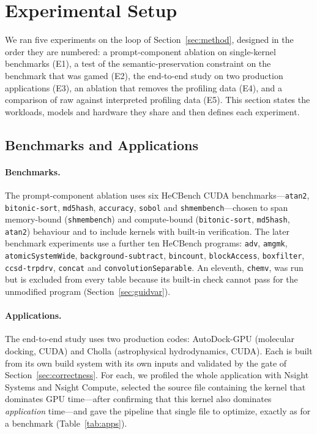 \section{Experimental Setup}
\label{sec:setup}
We ran five experiments on the loop of Section~\ref{sec:method}, designed in the order they are
numbered: a prompt-component ablation on single-kernel benchmarks (E1), a test of the
semantic-preservation constraint on the benchmark that was gamed (E2), the end-to-end study on two
production applications (E3), an ablation that removes the profiling data (E4), and a comparison of
raw against interpreted profiling data (E5). This section states the workloads, models and hardware
they share and then defines each experiment.

\subsection{Benchmarks and Applications}
\label{sec:explanation}
\paragraph{Benchmarks.}
The prompt-component ablation uses six HeCBench \cite{jin2023hecbench} CUDA benchmarks---\texttt{atan2},
\texttt{bitonic-sort}, \texttt{md5hash}, \texttt{accuracy}, \texttt{sobol} and
\texttt{shmembench}---chosen to span memory-bound (\texttt{shmembench}) and compute-bound
(\texttt{bitonic-sort}, \texttt{md5hash}, \texttt{atan2}) behaviour and to include kernels with
built-in verification. The later benchmark experiments use a further ten HeCBench programs:
\texttt{adv}, \texttt{amgmk}, \texttt{atomicSystemWide}, \texttt{background-subtract},
\texttt{bincount}, \texttt{blockAccess}, \texttt{boxfilter}, \texttt{ccsd-trpdrv}, \texttt{concat} and
\texttt{convolutionSeparable}. An eleventh, \texttt{chemv}, was run but is excluded from every table
because its built-in check cannot pass for the unmodified program (Section~\ref{sec:guidvar}).

\paragraph{Applications.}
The end-to-end study uses two production codes: AutoDock-GPU (molecular docking, CUDA) and Cholla
(astrophysical hydrodynamics, CUDA). Each is built from its own build system with its own inputs and
validated by the gate of Section~\ref{sec:correctness}. For each, we profiled the whole application
with Nsight Systems and Nsight Compute, selected the source file containing the kernel that dominates
GPU time---after confirming that this kernel also dominates \emph{application} time---and gave the
pipeline that single file to optimize, exactly as for a benchmark (Table~\ref{tab:apps}).

